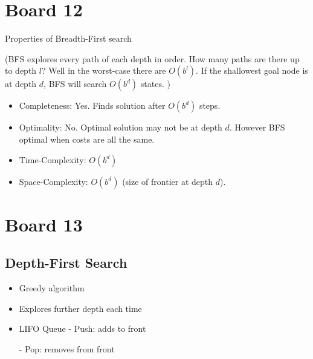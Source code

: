 \documentclass[10pt]{article}
\begin{document}
\section{Board 12}

Properties of Breadth-First search

(BFS explores every path of each depth in order. How many paths are
there up to depth $l$? Well in the worst-case there are $O(b^l)$. If
the shallowest goal node is at depth $d$, BFS will search $O(b^d)$
states. )

\begin{itemize}
\item Completeness: Yes. Finds solution after $O(b^d)$ steps.
\item Optimality: No. Optimal solution may not be at depth $d$. 
However BFS optimal when costs are all the same.
\item Time-Complexity: $O(b^d)$
\item Space-Complexity: $O(b^d)$ (size of frontier at depth $d$).
\end{itemize}

\section{Board 13}

\subsection{Depth-First Search}

\begin{itemize}
\item Greedy algorithm
\item Explores further depth each time
\item LIFO Queue
- Push: adds to front

- Pop: removes from front

\end{itemize}



\end{document}

